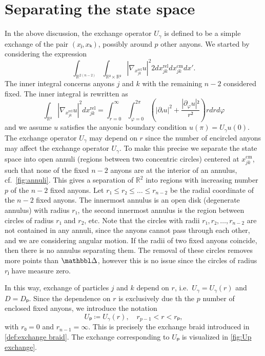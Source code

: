\section{Separating the state space}

In the above discussion, the exchange operator $U_γ$ is defined to be a simple exchange of the pair $(xⱼ,xₖ)$, possibly around $p$ other anyons. We started by considering the expression
\begin{equation}
  ∫_{ℝ^{2(n-2)}} ∫_{ℝ² \times ℝ²} \left|∇_{x_{jk}^\text{rel}}u\right|^2  2 dx_{jk}^\text{rel}dx_{jk}^\text{cm} dx'.
\end{equation}
The inner integral concerns anyons $j$ and $k$ with the remaining $n-2$ considered fixed. The inner integral is rewritten as
\begin{equation}
  ∫_{ℝ²} \left|∇_{x_{jk}^\text{rel}} u \right|^2 dx_{jk}^\text{rel} =
  ∫_{r=0}^∞ ∫_{φ=0}^{2π} \left( \left|∂ᵣu\right|^2 + \frac{\left|∂_φu\right|²}{r²} \right) r dr dφ
\end{equation}
and we assume $u$ satisfies the anyonic boundary condition $u(π) = U_γ u(0)$. The exchange operator $U_γ$ may depend on $r$ since the number of encircled anyons may affect the exchange operator $U_γ$. To make this precise we separate the state space into open annuli (regions between two concentric circles) centered at $x_{jk}^\text{cm}$, such that none of the fixed $n-2$ anyons are at the interior of an annulus, cf.\ \cref{fig:annuli}. This gives a separation of $ℝ^2$ into regions with increasing number $p$ of the $n-2$ fixed anyons. Let $r₁ \le r₂ \le … \le r_{n-2}$ be the radial coordinate of the $n-2$ fixed anyons. The innermost annulus is an open disk (degenerate annulus) with radius $r₁$, the second innermost annulus is the region between circles of radius $r₁$ and $r_2$, etc. Note that the circles with radii $r₁, r₂, …, r_{n-2}$ are not contained in any annuli, since the anyons cannot pass through each other, and we are considering angular motion. If the radii of two fixed anyons coincide, then there is no annulus separating them. The removal of these circles removes more points than $\bbDelta$, however this is no issue since the circles of radius $rⱼ$ have measure zero.

In this way, exchange of particles $j$ and $k$ depend on $r$, i.e.\ $U_γ = U_γ(r)$ and $D = Dₚ$. Since the dependence on $r$ is exclusively due th the $p$ number of enclosed fixed anyons, we introduce the notation
\begin{equation}
  Uₚ ≔ U_γ(r), \quad r_{p-1} < r < rₚ,
\end{equation}
with $r₀ = 0$ and $r_{n-1} = ∞$. This is precisely the exchange braid introduced in \cref{def:exchange braid}. The exchange corresponding to $Uₚ$ is visualized in \cref{fig:Up exchange}.

